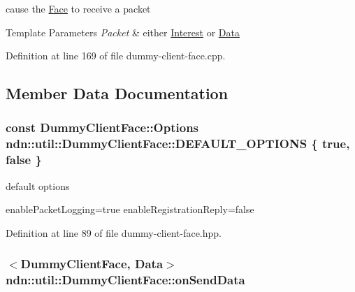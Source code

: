 cause the \hyperlink{classndn_1_1Face}{Face} to receive a packet 


\begin{DoxyTemplParams}{Template Parameters}
{\em Packet} & either \hyperlink{classndn_1_1Interest}{Interest} or \hyperlink{classndn_1_1Data}{Data} \\
\hline
\end{DoxyTemplParams}


Definition at line 169 of file dummy-\/client-\/face.\+cpp.



\subsection{Member Data Documentation}
\subsubsection[{\texorpdfstring{D\+E\+F\+A\+U\+L\+T\+\_\+\+O\+P\+T\+I\+O\+NS}{DEFAULT\_OPTIONS}}]{\setlength{\rightskip}{0pt plus 5cm}const {\bf Dummy\+Client\+Face\+::\+Options} ndn\+::util\+::\+Dummy\+Client\+Face\+::\+D\+E\+F\+A\+U\+L\+T\+\_\+\+O\+P\+T\+I\+O\+NS \{ true, false \}\hspace{0.3cm}{\ttfamily [static]}}\hypertarget{classndn_1_1util_1_1DummyClientFace_a4b7a8fe8f1bad715ad1df6ba68458dfb}{}\label{classndn_1_1util_1_1DummyClientFace_a4b7a8fe8f1bad715ad1df6ba68458dfb}


default options 

enable\+Packet\+Logging=true enable\+Registration\+Reply=false 

Definition at line 89 of file dummy-\/client-\/face.\+hpp.

\subsubsection[{\texorpdfstring{on\+Send\+Data}{onSendData}}]{$<${\bf Dummy\+Client\+Face}, {\bf Data}$>$ ndn\+::util\+::\+Dummy\+Client\+Face\+::on\+Send\+Data}\hypertarget{classndn_1_1util_1_1DummyClientFace_a8580730478c59a520b28cb87e6a1acf7}{}\label{classndn_1_1util_1_1DummyClientFace_a8580730478c59a520b28cb87e6a1acf7}


